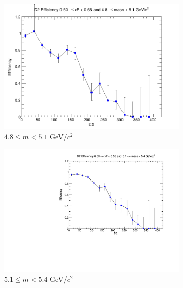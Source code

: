 \begin{figure}[p]
\begin{subfigure}[b]{0.32\textwidth}
        \centering
        \includegraphics[width=\textwidth]{./kTrackerEfficiencyPlots/D2_Efficiency_xF10_mass2.png}
        \caption{$4.8 \leq m < 5.1$ GeV/$c^2$}
        \label{fig:xF10_mass2}
    \end{subfigure}
    \vspace{0.5cm}
    \begin{subfigure}[b]{0.32\textwidth}
        \centering
        \includegraphics[width=\textwidth]{./kTrackerEfficiencyPlots/D2_Efficiency_xF10_mass3.pdf}
        \caption{$5.1 \leq m < 5.4$ GeV/$c^2$}
        \label{fig:xF10_mass3}
    \end{subfigure}
    \hfill
    \begin{subfigure}[b]{0.32\textwidth}
        \centering

\end{subfigure}
\end{figure}
